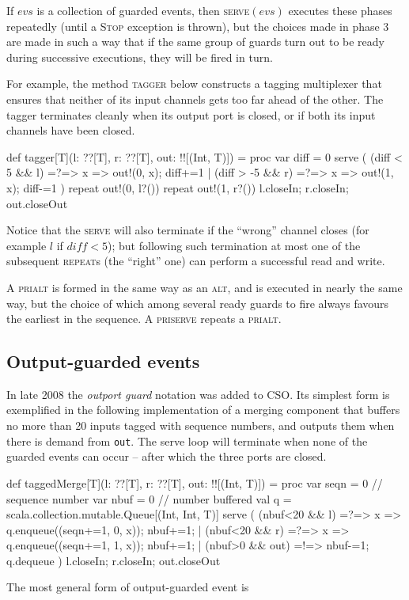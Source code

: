 \documentclass[12pt]{IOS-Book-Article-CPA-2017}
\begin{document}
If $evs$ is a collection of guarded events, then \textsc{serve}$(evs)$  executes these
phases repeatedly (until a \textsc{Stop} exception is thrown), but the choices made in phase 3 are made in such
a way that if the same group of guards turn out to be ready during
successive executions, they will be fired in turn.

For example, the method \textsc{tagger} below constructs a tagging
multiplexer that ensures that neither of its input channels
gets too far ahead of the other. The tagger terminates
cleanly when its output port is closed, or if both its
input channels have been closed. 
\begin{code+}[...]{}
  def tagger[T](l: ??[T], r: ??[T], out: !![(Int, T)]) = 
  proc
  { var diff = 0
    serve ( (diff < 5  && l) =?=> { x => out!(0, x); diff+=1 }
          | (diff > -5 && r) =?=> { x => out!(1, x); diff-=1 }
          ) 
    repeat { out!(0, l?()) } 
    repeat { out!(1, r?()) } 
    l.closeIn; r.closeIn; out.closeOut 
  }
\end{code+}
Notice that the  \textsc{serve} will also terminate if the ``wrong'' channel closes (for
example $l$ if $diff<5$); but following such termination at most one of the subsequent  
\textsc{repeat}s
(the ``right'' one) can perform a successful read and write.


A \textsc{prialt} is formed in the same way as an \textsc{alt},
and is executed in nearly the same way, but the choice of which among
several ready guards to fire always favours the earliest in the sequence.
A \textsc{priserve} repeats a \textsc{prialt}.

\subsection{Output-guarded events}
In late 2008 the \textit{outport guard} notation was added to CSO. Its simplest
form is exemplified in the following implementation of a merging component 
that buffers no more than 20 inputs tagged with sequence numbers, and 
outputs them when there is demand from \verb/out/. The serve loop 
will terminate when none of the guarded events can occur -- after which 
the three ports are closed.
\begin{code+}[...]{}
  def taggedMerge[T](l: ??[T], r: ??[T], out: !![(Int, T)]) = 
  proc
  { var seqn = 0 // sequence number
    var nbuf = 0 // number buffered 
    val q        = scala.collection.mutable.Queue[(Int, Int, T)]
    serve ( (nbuf<20 && l)   =?=> { x => q.enqueue((seqn+=1, 0, x)); nbuf+=1; }
          | (nbuf<20 && r)   =?=> { x => q.enqueue((seqn+=1, 1, x)); nbuf+=1; }
          | (nbuf>0  && out) =!=> { nbuf-=1; q.dequeue } 
          ) 
    l.closeIn; r.closeIn; out.closeOut  
  }
\end{code+}
The most general form of output-guarded event is
\end{document}
